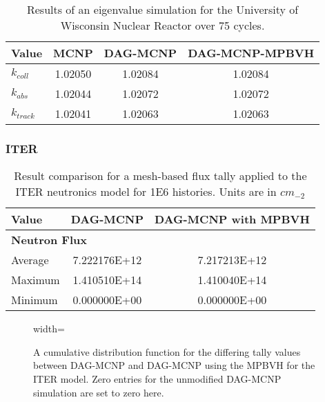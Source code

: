   
  \begin{table}[H]
    \small
    \begin{center}
      \begin{tabular}{lccc}
        \toprule
        Value     & MCNP    & DAG-MCNP & DAG-MCNP-MPBVH \\
        \toprule
        $k_{coll}$  & 1.02050 & 1.02084  & 1.02084        \\
        $k_{abs}$   & 1.02044 & 1.02072  & 1.02072        \\
        $k_{track}$ & 1.02041 & 1.02063  & 1.02063        \\
        \bottomrule
      \end{tabular}
    \end{center}
    \caption[Results of eigenvalue simulations in UWNR for various DAG-MCNP
      implementations.]{Results of an eigenvalue simulation for the University
      of Wisconsin Nuclear Reactor over 75 cycles.}
  \end{table}


  \subsubsection{ITER}

  \begin{table}[H]
    \small
    \begin{center}
      \begin{tabular}{lcc}
        \toprule
        Value   & DAG-MCNP     & DAG-MCNP with MPBVH      \\
        \toprule
        \multicolumn{3}{l}{\textbf{Neutron Flux}} \\
        Average & 7.222176E+12 & 7.217213E+12   \\
        Maximum & 1.410510E+14 & 1.410040E+14   \\
        Minimum & 0.000000E+00 & 0.000000E+00   \\       
        \bottomrule
      \end{tabular}
    \end{center}
    \caption[Flux tally results in the ITER model for various DAG-MCNP
      implementations.]{Result comparison for a mesh-based flux tally applied to
      the ITER neutronics model for \num{1E6} histories. Units are in $cm_{-2}$}
  \end{table}
  
  \begin{figure}[H]
    \centering
    {width=\textwidth}
    \caption[Analysis of differing mesh tallies in ITER.]{A cumulative
      distribution function for the differing tally values between DAG-MCNP and
      DAG-MCNP using the MPBVH for the ITER model. Zero entries for the
      unmodified DAG-MCNP simulation are set to zero here. }
  \end{figure}

